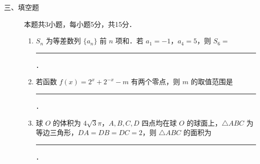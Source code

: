 \begin{description}
    \item[三、填空题] 本题共3小题，每小题5分，共15分．
    \begin{enumerate}[leftmargin=5pt]
      \addtocounter{enumi}{+11}
        \item $S_n$ 为等差数列 $\{a_n\}$ 前 $n$ 项和．若 $a_1=-1$，$a_4=5$，则 $S_6=$ \rule[-0.3ex]{3em}{0.4pt}．
        \item 若函数 $f(x)=2^x+2^{-x}-m$ 有两个零点，则 $m$ 的取值范围是 \rule[-0.3ex]{3em}{0.4pt}．
        \item 球 $O$ 的体积为 $4\sqrt{3}\pi$，$A,B,C,D$ 四点均在球 $O$ 的球面上，$\triangle ABC$ 为等边三角形，$DA=DB=DC=2$，则 $\triangle ABC$ 的面积为 \rule[-0.3ex]{3em}{0.4pt}．
    \end{enumerate}
\end{description}

